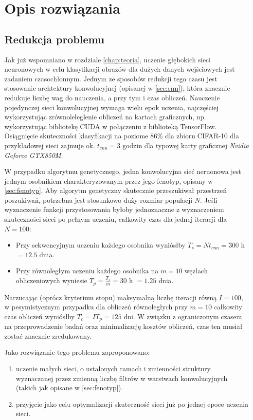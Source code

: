 \chapter{Opis rozwiązania}\label{chap:system_description}
\section{Redukcja problemu}\label{sec:reduction}
Jak już wspomniano w rozdziale \ref{chap:teoria}, uczenie głębokich sieci neuronowych w celu klasyfikacji obrazów dla dużych danych wejściowych jest zadaniem czasochłonnym.
Jednym ze sposobów redukcji tego czasu jest stosowanie archtektury konwolucyjnej (opisanej w \ref{sec:cnn}), która znacznie redukuje liczbę wag do nauczenia, a przy tym i czas obliczeń.
Nauczenie pojedynczej sieci konwolucyjnej wymaga wielu epok uczenia, najczęściej wykorzystując zrównoleleglenie obliczeń na kartach graficznych, np. wykorzystując bibliotekę CUDA w połączeniu z biblioteką TensorFlow.
Osiągnięcie skuteczności klasyfikacji na poziome 86\% dla zbioru CIFAR-10 dla przykładowej sieci zajmuje ok. $t_{cnn} = 3$ godzin dla typowej karty graficznej \textit{Nvidia Geforce GTX850M}. \cite{tensorflow2015-whitepaper}

W przypadku algorytmu genetycznego, jedna konwolucyjna sieć neruonowa jest jednym osobnikiem charakteryzowanym przez jego fenotyp, opisany w \ref{sec:fenotyp}.
Aby algorytm genetyczny skutecznie przeszukiwał przestrzeń poszukiwań, potrzebna jest stosunkowo duży rozmiar populacji $N$.
Jeśli wyznaczenie funkcji przystosowania byłoby jednoznaczne z wyznaczeniem skuteczności sieci po pełnym uczeniu, całkowity czas dla jednej iteracji dla $N = 100$:
 \begin{itemize}
	\item Przy sekwencyjnym uczeniu każdego osobnika wyniósłby $T_s = Nt_{cnn} = 300$ h$ =  12.5 $ dnia.
	\item Przy równoległym uczeniu każdego osobnika na $m = 10$ węzłach obliczeniowych wyniesie $T_p = \frac{T_s}{m} = 30$ h $= 1.25$ dnia.
\end{itemize}
Narzucając (oprócz kryterium stopu) maksymalną liczbę iteracji równą $I = 100$, w pesymistycznym przypadku dla obliczeń równoległych przy $m = 10$ całkowity czas obliczeń wyniósłby $T_c=IT_p=125$ dni.
W związku z ograniczonym czasem na przeprowadzenie badań oraz minimalizację kosztów obliczeń, czas ten musiał zostać znacznie zredukowany.

Jako rozwiązanie tego problemu zaproponowano:
\begin{enumerate}
	\item uczenie małych sieci, o ustalonych ramach i zmienności struktury wyznaczanej przez zmienną liczbę filtrów w warstwach konwolucyjnych (takich jak opisane w \ref{sec:fenotyp}).
	\item przyjęcie jako celu optymalizacji skuteczność sieci już po jednej epoce uczenia sieci.
\end{enumerate}

